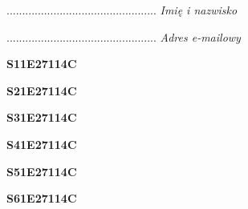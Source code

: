 \begin{turn}{90}\begin{minipage}{\linewidth} \vspace{20mm} ................................................  \textit{Imię i nazwisko}\end{minipage}\end{turn}

\begin{turn}{90}\begin{minipage}{\linewidth} \vspace{20mm} ................................................  \textit{Adres e-mailowy}\end{minipage}\end{turn}

\begin{turn}{90}\huge \begin{minipage}{\linewidth} \vspace{10mm}\textbf{S11E27114C}\end{minipage}\end{turn}

\begin{turn}{90}\huge \begin{minipage}{\linewidth} \vspace{10mm}\textbf{S21E27114C}\end{minipage}\end{turn}

\begin{turn}{90}\huge \begin{minipage}{\linewidth} \vspace{10mm}\textbf{S31E27114C}\end{minipage}\end{turn}

\begin{turn}{90}\huge \begin{minipage}{\linewidth} \vspace{10mm}\textbf{S41E27114C}\end{minipage}\end{turn}

\begin{turn}{90}\huge \begin{minipage}{\linewidth} \vspace{10mm}\textbf{S51E27114C}\end{minipage}\end{turn}

\begin{turn}{90}\huge \begin{minipage}{\linewidth} \vspace{10mm}\textbf{S61E27114C}\end{minipage}\end{turn}


